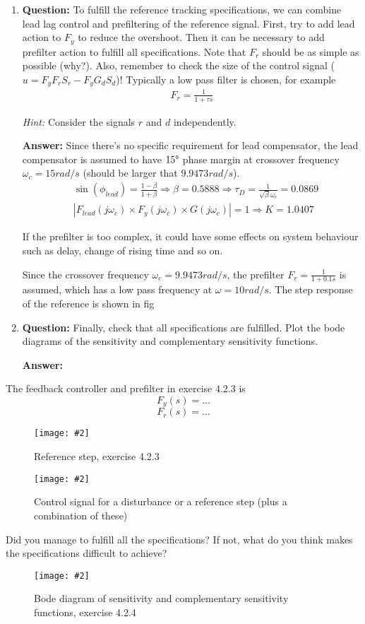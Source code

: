 \documentclass[11pt,a4paper]{article}
\newcommand{\image}[3]{
	\begin{figure}[!ht]
		\centering
	    \texttt{[image: \#2]}
		\caption{#3}
		\label{fig:#2}
	\end{figure}
}
\begin{document}
\begin{enumerate}[(1)]
	\item \textbf{Question:} To fulfill the reference tracking specifications, we can combine lead lag control and prefiltering of the reference signal. First, try to add lead action to $F_y$ to reduce the overshoot. Then it can be necessary to add prefilter action to fulfill all specifications. Note that $F_r$ should be as simple as possible (why?). Also, remember to check the size of the control signal ($u = F_y F_r S_r - F_y G_d S_d$)! Typically a low pass filter is chosen, for example
	\begin{align*}
		F_{r} = \frac{1}{1+\tau s}
	\end{align*}
	\par \textit{Hint:} Consider the signals $r$ and $d$ independently.
	\par \textbf{Answer:} Since there's no specific requirement for lead compensator, the lead compensator is assumed to have $15\degree$ phase margin at crossover frequency $\omega_{c} = 15 rad/s$ (should be larger that $9.9473 rad/s$).
	\begin{align*}
		& \sin(\phi_{lead}) = \frac{1 - \beta}{1 + \beta} \Rightarrow \beta = 0.5888 \Rightarrow \tau_{D} = \frac{1}{\sqrt{\beta}\omega_{c}} = 0.0869 \\
		& |F_{lead}(j\omega_{c})\times F_{y}(j\omega_{c})\times G(j\omega_{c})| = 1 \Rightarrow K = 1.0407
	\end{align*}
	\par If the prefilter is too complex, it could have some effects on system behaviour such as delay, change of rising time and so on.
	\par Since the crossover frequency $\omega_{c} = 9.9473 rad/s$, the prefilter $F_{r}=\frac{1}{1+0.1s}$ is assumed, which has a low pass frequency at $\omega = 10 rad/s$. The step response of the reference is shown in fig~
	
	\item \textbf{Question:} Finally, check that all specifications are fulfilled. Plot the bode diagrams of the sensitivity and complementary sensitivity functions.
	\par \textbf{Answer:} 
\end{enumerate}
	
	The feedback controller and prefilter in exercise 4.2.3 is 
	\[
	F_y(s) = \ldots
	\]
	\[
	F_r(s) = \ldots
	\]
	\image{0.25}{system}{Reference step, exercise 4.2.3}
	\image{0.25}{system}{Control signal for a disturbance or a reference step (plus a combination of these)}

	Did you manage to fulfill all the specifications? If not, what do you think makes the specifications difficult to achieve?
	\par\dotfill\par\dotfill\par
	
	\image{0.25}{system}{Bode diagram of sensitivity and complementary sensitivity functions, exercise 4.2.4}
\end{document}
